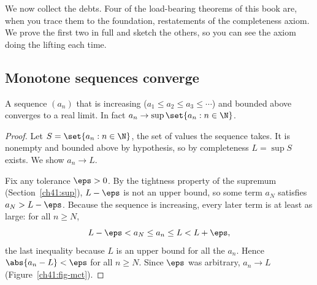 We now collect the debts. Four of the load-bearing theorems of this book are, when you
trace them to the foundation, restatements of the completeness axiom. We prove the first
two in full and sketch the others, so you can see the axiom doing the lifting each time.

\subsection*{Monotone sequences converge}

\begin{theorem}
\label{ch41:mct}
A sequence $(a_n)$ that is increasing ($a_1 \le a_2 \le a_3 \le \cdots$) and bounded above
converges to a real limit. In fact $a_n \to \sup\set{a_n : n\in\N}$.
\end{theorem}

\begin{proof}
Let $S = \set{a_n : n\in\N}$, the set of values the sequence takes. It is nonempty and
bounded above by hypothesis, so by completeness $L=\sup S$ exists. We show $a_n\to L$.

Fix any tolerance $\eps>0$. By the tightness property of the supremum
(Section~\ref{ch41:sup}), $L-\eps$ is not an upper bound, so some term $a_N$ satisfies
$a_N > L-\eps$. Because the sequence is increasing, every later term is at least as large:
for all $n\ge N$,
\[
  L-\eps < a_N \le a_n \le L < L + \eps,
\]
the last inequality because $L$ is an upper bound for all the $a_n$. Hence
$\abs{a_n - L}<\eps$ for all $n\ge N$. Since $\eps$ was arbitrary, $a_n\to L$
(Figure~\ref{ch41:fig-mct}).
\end{proof}

